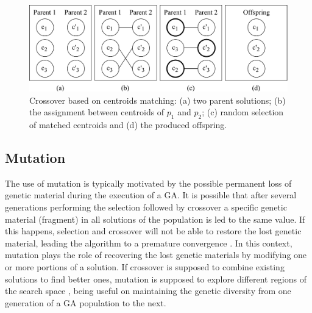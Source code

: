 \begin{figure}[H]
  \begin{center}
    \includegraphics[width=1.0\textwidth]{img/crossover}
    \caption{Crossover based on centroids matching: (a) two parent solutions; (b) the assignment between centroids of $p_1$ and $p_2$; (c) random selection of matched centroids and (d) the produced offspring.}\label{fig:crossover}
  \end{center}
\end{figure}




\subsection{Mutation}
\label{subsec:mutation}
The use of mutation is typically motivated by the possible permanent loss of genetic material during the execution of a GA. It is possible that after several generations performing the selection followed by crossover a specific genetic material (fragment) in all solutions of the population is led to the same value. If this happens, selection and crossover will not be able to restore the lost genetic material, leading the algorithm to a premature convergence \cite{Whitley1994}. In this context, mutation plays the role of recovering the lost genetic materials by modifying one or more portions of a solution. If crossover is supposed to combine existing solutions to find better ones, mutation is supposed to explore different regions of the search space \cite{Abdoun2012}, being useful on maintaining the genetic diversity from one generation of a GA population to the next.

